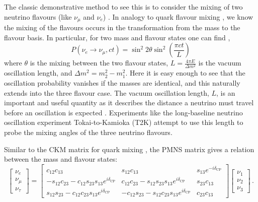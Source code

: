 The classic demonstrative method to see this is to consider the mixing of two neutrino flavours (like $\nu_{\mu}$ and $\nu_{e}$) \cite{solar_nu}. In analogy to quark flavour mixing \cite{pdg_ckm}, we know the mixing of the flavours occurs in the transformation from the mass to the flavour basis. In particular, for two mass and flavour states one can find \cite{solar_nu},
\begin{equation}
  P(\nu_{e} \to \nu_{\mu}, ct) = \sin^{2}2\theta\sin^{2}\left(\frac{\pi ct}{L}\right)
\end{equation}
where $\theta$ is the mixing between the two flavour states, $L = \frac{4\pi E}{\Delta m^{2}}$ is the vacuum oscillation length, and $\Delta m^{2} = m_{2}^{2} - m_{1}^{2}$. Here it is easy enough to see that the oscillation probability vanishes if the masses are identical, and this naturally extends into the three flavour case. The vacuum oscillation length, $L$, is an important and useful quantity as it describes the distance a neutrino must travel before an oscillation is expected \cite{solar_nu}. Experiments like the long-baseline neutrino oscillation experiment Tokai-to-Kamioka (T2K) attempt to use this length to probe the mixing angles of the three neutrino flavours. 

Similar to the CKM matrix for quark mixing \cite{pdg_ckm}, the PMNS matrix \cite{pmns} gives a relation between the mass and flavour states:
\begin{equation}
  \begin{bmatrix}
    \nu_{e} \\
    \nu_{\mu} \\
    \nu_{\tau}
  \end{bmatrix}
  =
  \begin{bmatrix}
    c_{12}c_{13} & s_{12}c_{13} & s_{13}e^{-i\delta_{\text{CP}}} \\
    -s_{12}c_{23}-c_{12}s_{23}s_{13}e^{i\delta_{\text{CP}}} & c_{12}c_{23} - s_{12}s_{23}s_{13}e^{i\delta_{\text{CP}}} & s_{23}c_{13} \\
    s_{12}s_{23}-c_{12}c_{23}s_{13}e^{i\delta_{\text{CP}}} & -c_{12}s_{23} - s_{12}c_{23}s_{13}e^{i\delta_{\text{CP}}} & c_{23}c_{13}
  \end{bmatrix}
  \begin{bmatrix}
    \nu_{1} \\
    \nu_{2} \\
    \nu_{3}
  \end{bmatrix}
  \, .
\end{equation}


